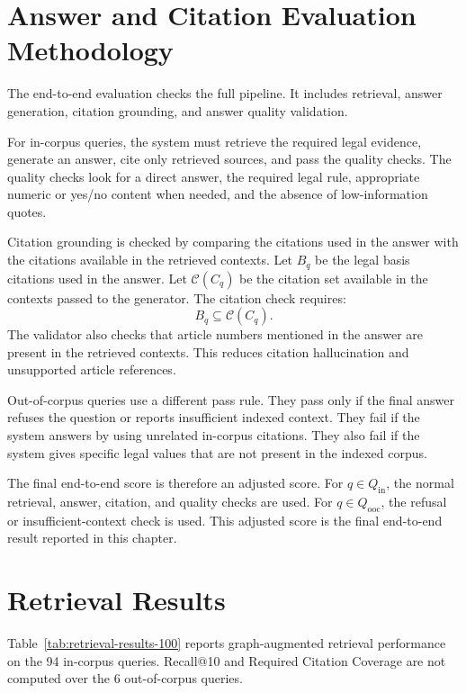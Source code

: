 \section{Answer and Citation Evaluation Methodology}
\label{sec:answer-and-citation-evaluation-methodology}

The end-to-end evaluation checks the full pipeline. It includes retrieval, answer generation, citation grounding, and answer quality validation.

For in-corpus queries, the system must retrieve the required legal evidence, generate an answer, cite only retrieved sources, and pass the quality checks. The quality checks look for a direct answer, the required legal rule, appropriate numeric or yes/no content when needed, and the absence of low-information quotes.

Citation grounding is checked by comparing the citations used in the answer with the citations available in the retrieved contexts. Let $B_q$ be the legal basis citations used in the answer. Let $\mathcal{C}(C_q)$ be the citation set available in the contexts passed to the generator. The citation check requires:
\[
B_q \subseteq \mathcal{C}(C_q).
\]
The validator also checks that article numbers mentioned in the answer are present in the retrieved contexts. This reduces citation hallucination and unsupported article references.

Out-of-corpus queries use a different pass rule. They pass only if the final answer refuses the question or reports insufficient indexed context. They fail if the system answers by using unrelated in-corpus citations. They also fail if the system gives specific legal values that are not present in the indexed corpus.

The final end-to-end score is therefore an adjusted score. For $q \in Q_{\mathrm{in}}$, the normal retrieval, answer, citation, and quality checks are used. For $q \in Q_{\mathrm{ooc}}$, the refusal or insufficient-context check is used. This adjusted score is the final end-to-end result reported in this chapter.

\section{Retrieval Results}
\label{sec:retrieval-performance-analysis-results}

Table~\ref{tab:retrieval-results-100} reports graph-augmented retrieval performance on the 94 in-corpus queries. Recall@10 and Required Citation Coverage are not computed over the 6 out-of-corpus queries.

